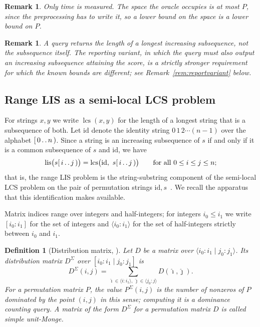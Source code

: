 \documentclass[10pt]{article}
\newtheorem{definition}{Definition}
\newtheorem{remark}[theorem]{Remark}
\newcommand{\lcs}{\operatorname{lcs}}
\newcommand{\lis}{\operatorname{lis}}
\newcommand{\id}{\mathrm{id}}
\begin{document}
\begin{remark}\label{rem:timeonly}
Only time is measured. The space the oracle occupies is at most $P$, since the
preprocessing has to write it, so a lower bound on the space is a lower bound
on $P$.
\end{remark}

\begin{remark}\label{rem:report}
A query returns the \emph{length} of a longest increasing subsequence, not the
subsequence itself. The reporting variant, in which the query must also output
an increasing subsequence attaining the score, is a strictly stronger
requirement for which the known bounds are different; see
Remark~\ref{rem:reportvariant} below.
\end{remark}

\subsection{Range LIS as a semi-local LCS problem}\label{sec:seaweed}

For strings $x,y$ we write $\lcs(x,y)$ for the length of a longest string that
is a subsequence of both. Let $\id$ denote the identity string
$0\,1\,2\cdots(n-1)$ over the alphabet $[\,0\mathinner{.\,.}n\,)$. Since a string is an
increasing subsequence of $s$ if and only if it is a common subsequence of $s$
and $\id$, we have
\begin{equation}\label{eq:lislcs}
\lis\bigl(s[\,i\mathinner{.\,.}j\,)\bigr)=\lcs\bigl(\id,\ s[\,i\mathinner{.\,.}j\,)\bigr)
\qquad\text{for all }0\le i\le j\le n;
\end{equation}
that is, the range LIS problem is the string-substring component of the
semi-local LCS problem on the pair of permutation strings
$\id,s$~\cite[Section 8.1]{TiskinArXiv}. We recall the apparatus that this
identification makes available.

Matrix indices range over integers and half-integers; for integers
$i_0\le i_1$ we write $[i_0:i_1]$ for the set of integers and
$\langle i_0:i_1\rangle$ for the set of half-integers strictly between $i_0$
and $i_1$.

\begin{definition}[Distribution matrix, {\cite[Definition 2.1]{TiskinArXiv}}]\label{def:dist}
Let $D$ be a matrix over $\langle i_0:i_1\mid j_0:j_1\rangle$. Its
\emph{distribution matrix} $D^{\Sigma}$ over $[i_0:i_1\mid j_0:j_1]$ is
\[
D^{\Sigma}(i,j)=\sum_{\hat\imath\in\langle i:i_1\rangle,\ \hat\jmath\in\langle j_0:j\rangle}D(\hat\imath,\hat\jmath).
\]
For a permutation matrix $P$, the value $P^{\Sigma}(i,j)$ is the number of
nonzeros of $P$ dominated by the point $(i,j)$ in this sense; computing it is a
\emph{dominance counting} query. A matrix of the form $D^\Sigma$ for a
permutation matrix $D$ is called \emph{simple unit-Monge}.
\end{definition}
\end{document}
